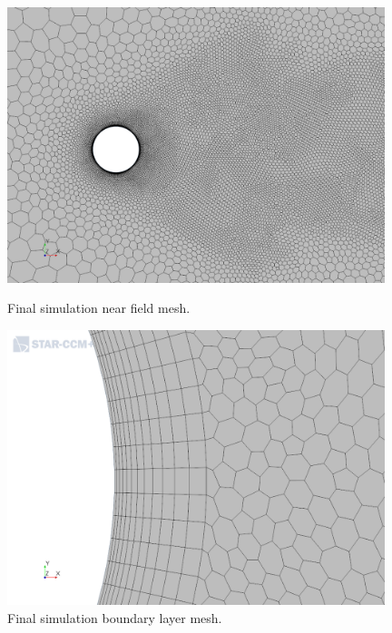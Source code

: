 \documentclass[10pt,english]{article}
\begin{document}
\begin{figure}[h]
\centering
\begin{minipage}{.49\textwidth}
  \centering
\includegraphics[trim={2.0cm 0cm 2.5cm .5cm},clip,width=0.98\textwidth]{cylinder_2_016_MeshScene2_2.png}
\caption{Final simulation near field mesh.}
\label{f:cylinder_2_016_MeshScene2_2}
\end{minipage}%
\hspace{5pt}
\begin{minipage}{.49\textwidth}
  \centering
\includegraphics[trim={2.0cm 0cm 2.5cm .5cm},clip,width=0.98\textwidth]{cylinder_2_016_MeshScene2_3.png}
\caption{\vspace{0pt}Final simulation boundary layer mesh.}
\label{f:cylinder_2_016_MeshScene2_3}
\end{minipage}
\end{figure}
\end{document}

